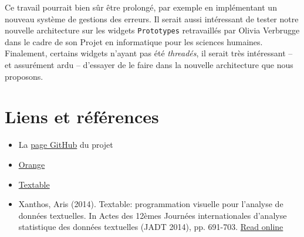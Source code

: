 \documentclass{article}
\begin{document}
Ce travail pourrait bien sûr être prolongé, par exemple en implémentant un nouveau système de gestions des erreurs. Il serait aussi intéressant de tester notre nouvelle architecture sur les widgets \texttt{Prototypes} retravaillés par Olivia Verbrugge dans le cadre de son Projet en informatique pour les sciences humaines. Finalement, certains widgets n'ayant pas été \textit{threadés}, il serait très intéressant – et assurément ardu – d'essayer de le faire dans la nouvelle architecture que nous proposons.

\section{Liens et références}

\begin{itemize}
    \item La \href{https://github.com/johancuda/rapport_projet_ISH_MA}{page GitHub} du projet
    \item \href{https://orangedatamining.com/}{Orange}
    \item \href{http://textable.io/}{Textable}
    \item Xanthos, Aris (2014). Textable: programmation visuelle pour l’analyse de données textuelles. In Actes des 12èmes Journées internationales d’analyse statistique des données textuelles (JADT 2014), pp. 691-703. \href{http://lexicometrica.univ-paris3.fr/jadt/jadt2014/01-ACTES/57-JADT2014.pdf}{Read online}
\end{itemize}
\end{document}
